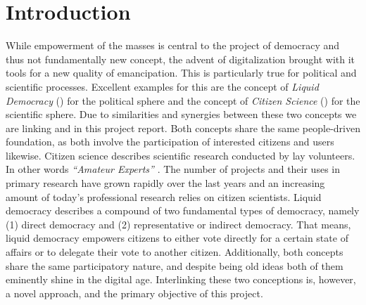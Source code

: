 \chapter{Introduction}
\label{ch:Introduction}


While empowerment of the masses is central to the project of democracy and thus not fundamentally new concept, the advent of digitalization brought with it tools for a new quality of emancipation. This is particularly true for political and scientific processes. Excellent examples for this are the concept of \textit{Liquid Democracy} () for the political sphere and the concept of \textit{Citizen Science} () for the scientific sphere. Due to similarities and synergies between these two concepts we are linking  and  in this project report. Both concepts share the same people-driven foundation, as both involve the participation of interested citizens and users likewise. Citizen science describes scientific research conducted by lay volunteers. In other words \textit{“Amateur Experts”}  \parencite{Gura2013}. The number of  projects and their uses in primary research have grown rapidly over the last years \parencite{Kosmala2016} and an increasing amount of today’s professional research relies on citizen scientists. Liquid democracy describes a compound of two fundamental types of democracy, namely (1) direct democracy and (2) representative or indirect democracy. That means, liquid democracy empowers citizens to either vote directly for a certain state of affairs or to  delegate their vote to another citizen. Additionally, both concepts share the same participatory nature, and despite being old ideas both of them eminently shine in the digital age. Interlinking these two conceptions is, however, a novel approach, and the primary objective of this project.


